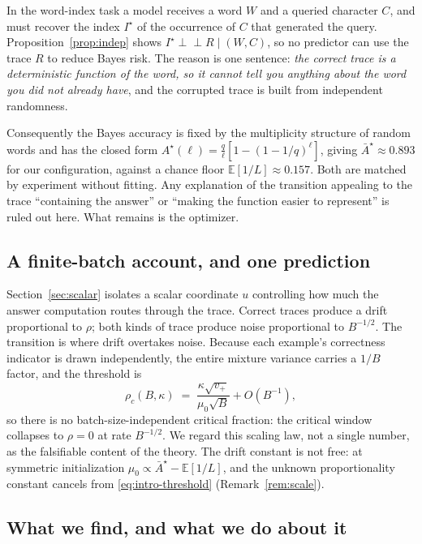 \documentclass{article}
\theoremstyle{plain}
\theoremstyle{definition}
\theoremstyle{remark}
\newcommand{\E}{\mathbb{E}}
\newcommand{\1}{\mathbf{1}}
\newcommand{\indep}{\perp\!\!\!\perp}
\begin{document}
In the word-index task a model receives a word $W$ and a queried character $C$,
and must recover the index $I^\star$ of the occurrence of $C$ that generated the
query. Proposition~\ref{prop:indep} shows $I^\star \indep R \mid (W,C)$, so no
predictor can use the trace $R$ to reduce Bayes risk. The reason is one sentence:
\emph{the correct trace is a deterministic function of the word, so it cannot
tell you anything about the word you did not already have}, and the corrupted
trace is built from independent randomness.

Consequently the Bayes accuracy is fixed by the multiplicity structure of random
words and has the closed form $A^\star(\ell) = \frac{q}{\ell}[1-(1-1/q)^{\ell}]$,
giving $\bar A^\star \approx 0.893$ for our configuration, against a chance floor
$\E[1/L]\approx0.157$. Both are matched by experiment without fitting. Any
explanation of the transition appealing to the trace ``containing the answer'' or
``making the function easier to represent'' is ruled out here. What remains is
the optimizer.

\subsection{A finite-batch account, and one prediction}

Section~\ref{sec:scalar} isolates a scalar coordinate $u$ controlling how much
the answer computation routes through the trace. Correct traces produce a drift
proportional to $\rho$; both kinds of trace produce noise proportional to
$B^{-1/2}$. The transition is where drift overtakes noise. Because each example's
correctness indicator is drawn independently, the entire mixture variance carries
a $1/B$ factor, and the threshold is
\begin{equation}
\label{eq:intro-threshold}
\rho_c(B,\kappa) \;=\; \frac{\kappa\sqrt{v_+}}{\mu_0\sqrt B} + O(B^{-1}),
\end{equation}
so there is no batch-size-independent critical fraction: the critical window
collapses to $\rho = 0$ at rate $B^{-1/2}$. We regard this scaling law, not a
single number, as the falsifiable content of the theory. The drift constant is
not free: at symmetric initialization $\mu_0 \propto \bar A^\star - \E[1/L]$, and
the unknown proportionality constant cancels from \eqref{eq:intro-threshold}
(Remark~\ref{rem:scale}).

\subsection{What we find, and what we do about it}
\end{document}

